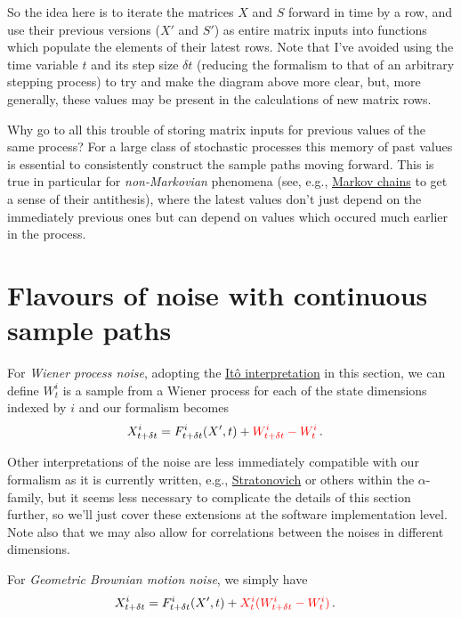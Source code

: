 \documentclass{book}
\begin{document}
So the idea here is to iterate the matrices $X$ and $S$ forward in time by a row, and use their previous versions ($X'$ and $S'$) as entire matrix inputs into functions which populate the elements of their latest rows. Note that I've avoided using the time variable $t$ and its step size $\delta t$ (reducing the formalism to that of an arbitrary stepping process) to try and make the diagram above more clear, but, more generally, these values may be present in the calculations of new matrix rows.

Why go to all this trouble of storing matrix inputs for previous values of the same process? For a large class of stochastic processes this memory of past values is essential to consistently construct the sample paths moving forward. This is true in particular for \emph{non-Markovian} phenomena (see, e.g., \href{https://en.wikipedia.org/wiki/Markov_chain}{Markov chains} to get a sense of their antithesis), where the latest values don't just depend on the immediately previous ones but can depend on values which occured much earlier in the process.

\section{\sffamily Flavours of noise with continuous sample paths}

For \emph{Wiener process noise}, adopting the \href{https://en.wikipedia.org/wiki/It\%C3\%B4_calculus}{Itô interpretation} in this section, we can define $W^i_{t}$ is a sample from a Wiener process for each of the state dimensions indexed by $i$ and our formalism becomes
\begin{align}
& X^i_{t+\delta t} = F^i_{t+\delta t}(X', t) + \textcolor{red}{W^i_{t+\delta t}-W^i_{t}}\,.
\end{align}

Other interpretations of the noise are less immediately compatible with our formalism as it is currently written, e.g., \href{https://en.wikipedia.org/wiki/Stratonovich_integral}{Stratonovich} or others within the $\alpha$-family, but it seems less necessary to complicate the details of this section further, so we'll just cover these extensions at the software implementation level. Note also that we may also allow for correlations between the noises in different dimensions. 

For \emph{Geometric Brownian motion noise}, we simply have
\begin{align}
& X^i_{t+\delta t} = F^i_{t+\delta t}(X', t) + \textcolor{red}{X^i_{t}(W^i_{t+\delta t}-W^i_{t})}\,.
\end{align}
\end{document}
